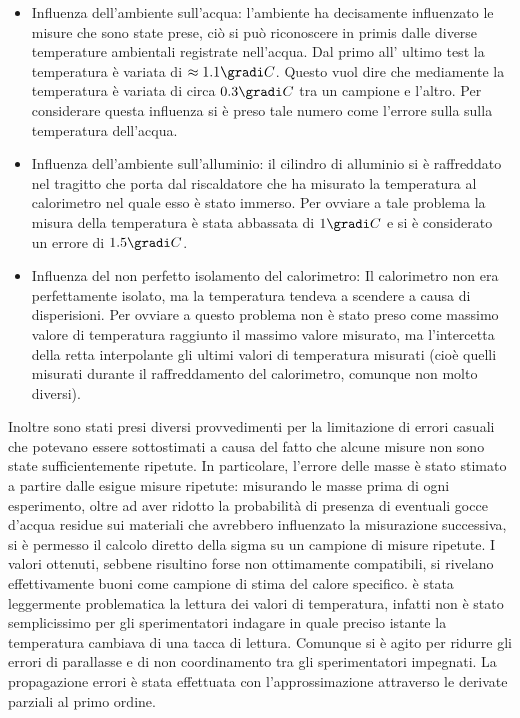\begin{itemize}
\item Influenza dell'ambiente sull'acqua: l'ambiente ha decisamente influenzato le misure che sono state prese, ciò si può
riconoscere in primis dalle diverse temperature ambientali registrate nell'acqua. Dal primo all'
ultimo test la temperatura è variata di $ \approx 1.1 \gradi C$. Questo vuol dire che mediamente la temperatura è 
variata di circa $0.3\gradi C$ tra un campione e l'altro. Per considerare questa influenza si 
è preso tale numero come l'errore sulla sulla temperatura dell'acqua.
\item Influenza dell'ambiente sull'alluminio: il cilindro di alluminio si è raffreddato nel tragitto che porta
 dal riscaldatore che ha misurato la temperatura al calorimetro nel quale esso è stato immerso. Per ovviare
 a tale problema la misura della temperatura è stata abbassata di $1 \gradi C$ e si è considerato un errore di 
$1.5 \gradi C$.
\item Influenza del non perfetto isolamento del calorimetro: Il calorimetro non era perfettamente isolato,
 ma la temperatura tendeva a scendere a causa di disperisioni. Per ovviare a questo problema non è stato preso come
 massimo valore di temperatura raggiunto il massimo valore misurato, ma l'intercetta della retta interpolante
 gli ultimi valori di temperatura misurati (cioè quelli misurati durante il raffreddamento del calorimetro, comunque
non molto diversi).
\end{itemize}
Inoltre sono stati presi diversi provvedimenti per la limitazione di errori casuali che potevano essere sottostimati
 a causa del fatto che alcune misure non sono state sufficientemente ripetute. In particolare, l'errore delle masse è
 stato stimato a partire dalle esigue misure ripetute: misurando le masse prima di ogni esperimento, oltre ad
 aver ridotto la probabilità di presenza di eventuali gocce d'acqua residue sui materiali che avrebbero influenzato la
 misurazione successiva, si è permesso il calcolo diretto della sigma su un campione di misure ripetute.
 I valori ottenuti, sebbene risultino forse non ottimamente compatibili, si rivelano effettivamente buoni come campione
 di stima del calore specifico.
 è stata leggermente problematica la lettura dei valori di temperatura, infatti non è stato semplicissimo per gli sperimentatori
 indagare in quale preciso istante la temperatura cambiava di una tacca di lettura. Comunque si è agito per
 ridurre gli errori di parallasse e di non coordinamento tra gli sperimentatori impegnati.
 La propagazione errori è stata effettuata con l'approssimazione attraverso le derivate parziali al primo ordine.
